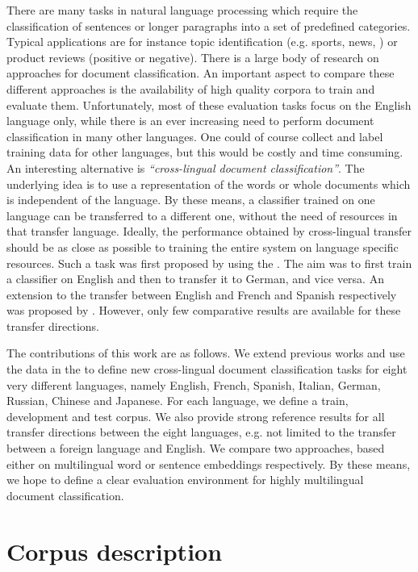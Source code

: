 \documentclass[10pt, a4paper]{article}
\begin{document}
There are many tasks in natural language processing which require the
classification of sentences or longer paragraphs into a set of predefined
categories.  Typical applications are for instance topic identification
(e.g. sports, news, ) or product reviews (positive or negative).
There is a large body of research on approaches for document classification.
An important aspect to compare these different approaches is the availability
of high quality corpora to train and evaluate them.  Unfortunately, most of
these evaluation tasks focus on the English language only, while there is an
ever increasing need to perform document classification in many other
languages.  One could of course collect and label training data for other
languages, but this would be costly and time consuming.
An interesting alternative is \textit{``cross-lingual document
classification''}.  The underlying idea is to use a representation of the words
or whole documents which is independent of the language. By these means, a
classifier trained on one language can be transferred to a different one,
without the need of resources in that transfer language.  Ideally, the
performance obtained by cross-lingual transfer should be as close as possible to
training the entire system on language specific resources.
Such a task was first proposed by \cite{Klementiev:2012:coling_reuters} using
the \rcv{}.  The aim was to first train a classifier on English and then to transfer
it to German, and vice versa.  An extension to the transfer
between English and French and Spanish respectively was proposed by \cite{Mougadala:2016:naacl_biword}.
However, only few comparative results are available for these transfer directions.

The contributions of this work are as follows. We extend previous works and use
the data in the \rcv{} to
define new cross-lingual document classification tasks for eight very different
languages, namely English, French, Spanish, Italian, German, Russian, Chinese and Japanese.
For each language, we define a train, development and test
corpus.
We also provide strong reference results for all transfer directions between
the eight languages, e.g. not limited to the transfer between a foreign language
and English.
We compare two approaches, based either on multilingual word or sentence
embeddings respectively.  By these means, we hope to define a clear evaluation
environment for highly multilingual document classification.

\section{Corpus description}
\end{document}
